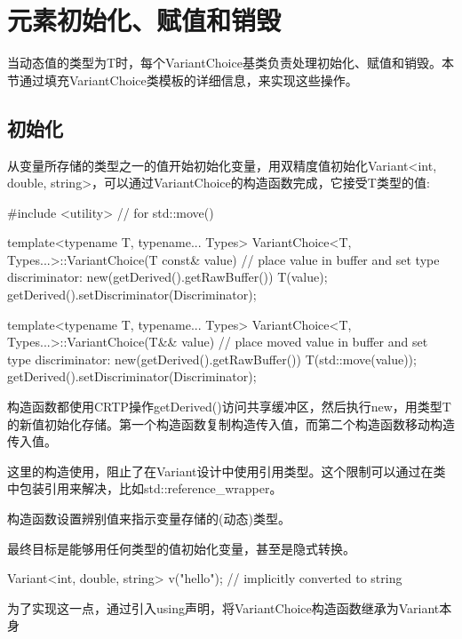 \section{元素初始化、赋值和销毁}


当动态值的类型为T时，每个VariantChoice基类负责处理初始化、赋值和销毁。本节通过填充VariantChoice类模板的详细信息，来实现这些操作。


\subsection{初始化}

从变量所存储的类型之一的值开始初始化变量，用双精度值初始化Variant<int, double, string>，可以通过VariantChoice的构造函数完成，它接受T类型的值:

\begin{cpp}
#include <utility> // for std::move()

template<typename T, typename... Types>
VariantChoice<T, Types...>::VariantChoice(T const& value) {
	// place value in buffer and set type discriminator:
	new(getDerived().getRawBuffer()) T(value);
	getDerived().setDiscriminator(Discriminator);
}

template<typename T, typename... Types>
VariantChoice<T, Types...>::VariantChoice(T&& value) {
	// place moved value in buffer and set type discriminator:
	new(getDerived().getRawBuffer()) T(std::move(value));
	getDerived().setDiscriminator(Discriminator);
}
\end{cpp}

构造函数都使用CRTP操作getDerived()访问共享缓冲区，然后执行new，用类型T的新值初始化存储。第一个构造函数复制构造传入值，而第二个构造函数移动构造传入值。

\begin{notice}
这里的构造使用，阻止了在Variant设计中使用引用类型。这个限制可以通过在类中包装引用来解决，比如std::reference\_wrapper。
\end{notice}

构造函数设置辨别值来指示变量存储的(动态)类型。

最终目标是能够用任何类型的值初始化变量，甚至是隐式转换。

\begin{cpp}
Variant<int, double, string> v("hello"); // implicitly converted to string
\end{cpp}

为了实现这一点，通过引入using声明，将VariantChoice构造函数继承为Variant本身

